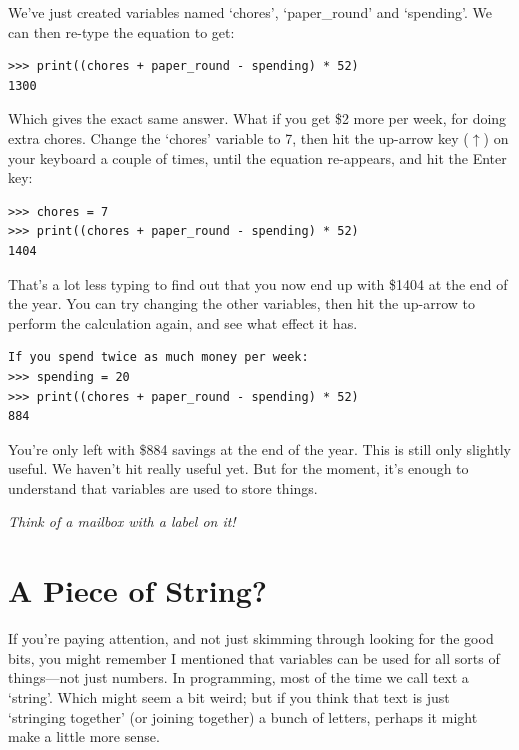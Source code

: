 \noindent
We've just created variables named `chores', `paper\_round' and `spending'.  We can then re-type the equation to get:

\begin{listing}
\begin{verbatim}
>>> print((chores + paper_round - spending) * 52)
1300
\end{verbatim}
\end{listing}

Which gives the exact same answer.  What if you get \$2 more per week, for doing extra chores.  Change the `chores' variable to 7, then hit the up-arrow key ($\uparrow$) on your keyboard a couple of times, until the equation re-appears, and hit the Enter key:

\begin{listing}
\begin{verbatim}
>>> chores = 7
>>> print((chores + paper_round - spending) * 52)
1404
\end{verbatim}
\end{listing}

That's a lot less typing to find out that you now end up with \$1404 at the end of the year.  You can try changing the other variables, then hit the up-arrow to perform the calculation again, and see what effect it has.

\begin{listing}
\begin{verbatim}
If you spend twice as much money per week:
>>> spending = 20
>>> print((chores + paper_round - spending) * 52)
884
\end{verbatim}
\end{listing}

You're only left with \$884 savings at the end of the year. This is still only slightly useful.  We haven't hit really useful yet.  But for the moment, it's enough to understand that variables are used to store things.

\noindent
\emph{Think of a mailbox with a label on it!}

\section{A Piece of String?}

If you're paying attention, and not just skimming through looking for the good bits, you might remember I mentioned that variables can be used for all sorts of things---not just numbers. In programming, most of the time we call text a `string'. Which might seem a bit weird; but if you think that text is just `stringing together' (or joining together) a bunch of letters, perhaps it might make a little more sense.

